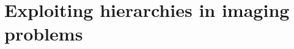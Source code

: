 \documentclass{beamer}
\newcommand{\Lo}{L}
\begin{document}

\part{Exploiting hierarchies in imaging problems}
\frame[plain]{\partpage}
\end{document}
